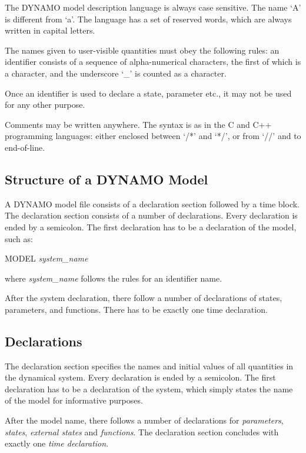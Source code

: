 The DYNAMO model description language is always case sensitive. The name
`A' is different from `a'. The language has a set of
reserved words, which are always written in capital letters.

The names given to user-visible quantities must obey the following
rules: an identifier consists of a sequence of alpha-numerical
characters, the first of which is a character, and the underscore
`\_' is counted as a character.

Once an identifier is used to declare a state, parameter etc., it
may not be used for any other purpose.

Comments may be written anywhere. The syntax is as in the C and C++
programming languages: either enclosed between `/*' and
`*/', or from `//' and to end-of-line.

\subsection{Structure of a DYNAMO Model}

A DYNAMO model file consists of a declaration section followed by a time block. The declaration section consists of a number of declarations. Every declaration is ended by a semicolon. The first declaration has to be a declaration of the model, such as:

\begin{example}
  MODEL \emph{system\_name}
\end{example}

where \emph{system\_name} follows the rules for an identifier name.

After the system declaration, there follow a number of declarations of states, parameters, and functions. There has to be exactly one time declaration.

\subsection{Declarations}

The declaration section specifies the names and initial values of all
quantities in the dynamical system. Every declaration is ended by a
semicolon. The first declaration has to be a declaration of the
system, which simply states the name of the model for informative
purposes.  

After the model name, there follows a number of declarations for
\emph{parameters}, \emph{states}, \emph{external states} and
\emph{functions}.  The declaration section concludes with exactly one
\emph{time declaration}.

